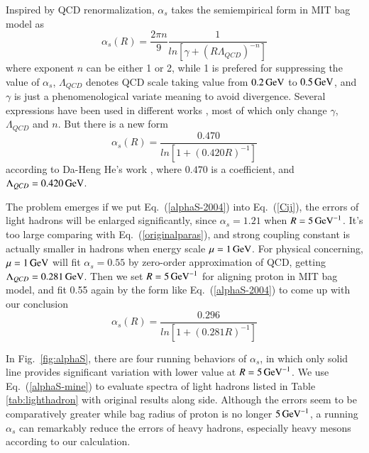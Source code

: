 \documentclass[prd,twocolumn,floatfix,nofootinbib]{revtex4}
\begin{document}
Inspired by QCD renormalization, $\alpha_{s}$ takes the semiempirical form in MIT bag model as 
\begin{equation}\label{alphaS}
    \alpha_{s}(R)=\frac{2\pi n}{9} \frac{1}{ln\left[\gamma+{\left(R\Lambda_{QCD}\right)}^{-n}\right]}
\end{equation}
where exponent $n$ can be either 1 or 2, while 1 is prefered for suppressing the value of $\alpha_{s}$,
$\Lambda_{QCD}$ denotes QCD scale taking value from $0.2\,{\rm GeV}$ to $0.5\,{\rm GeV}$,
and $\gamma$ is just a phenomenological variate meaning to avoid divergence.
Several expressions have been used in different works \cite{Haxton:1980mc,Aerts:1980rf,Carlson:1982er,He:2004px,Fleck:1989mb}, most of which only change $\gamma$, $\Lambda_{QCD}$ and $n$.
But there is a new form
\begin{equation}\label{alphaS-2004}
    \alpha_{s}(R)=\frac{0.470}{ln\left[1+{\left(0.420R\right)}^{-1}\right]}
\end{equation}
according to Da-Heng He's work \cite{He:2004px}, where $0.470$ is a coefficient, and $\Lambda_{QCD}=0.420\,{\rm GeV}$.

The problem emerges if we put Eq.~(\ref{alphaS-2004}) into Eq.~(\ref{Cij}), the errors of light hadrons will be enlarged significantly, since $\alpha_{s}=1.21$ when $R=5\,{\rm GeV}^{-1}$.
It's too large comparing with Eq.~(\ref{originalparas}), and strong coupling constant is actually smaller in hadrons when energy scale $\mu=1\,{\rm GeV}$.
For physical concerning, $\mu=1\,{\rm GeV}$ will fit $\alpha_{s}=0.55$ by zero-order approximation of QCD, getting $\Lambda_{QCD}=0.281\,{\rm GeV}$. 
Then we set $R=5\,{\rm GeV}^{-1}$ for aligning proton in MIT bag model, and fit 0.55 again by the form like Eq.~(\ref{alphaS-2004}) to come up with our conclusion
\begin{equation}\label{alphaS-mine}
    \alpha_{s}(R)=\frac{0.296}{ln\left[1+{\left(0.281R\right)}^{-1}\right]}
\end{equation}

In Fig.~\ref{fig:alphaS}, there are four running behaviors of $\alpha_{s}$,
in which only solid line provides significant variation with lower value at $R=5\,{\rm GeV}^{-1}$.
We use Eq.~(\ref{alphaS-mine}) to evaluate spectra of light hadrons listed in Table \ref{tab:lighthadron} with original results along side.
Although the errors seem to be comparatively greater while bag radius of proton is no longer $5\,{\rm GeV}^{-1}$,
a running $\alpha_{s}$ can remarkably reduce the errors of heavy hadrons, especially heavy mesons according to our calculation.
\end{document}
